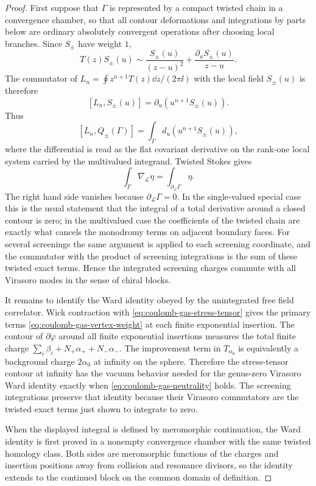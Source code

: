 \begin{proof}
First suppose that \(\Gamma\) is represented by a compact twisted chain in a
convergence chamber, so that all contour deformations and integrations by
parts below are ordinary absolutely convergent operations after choosing local
branches.  Since \(S_\pm\) have weight \(1\),
\[
  T(z)S_\pm(u)
  \sim
  \frac{S_\pm(u)}{(z-u)^2}
  +
  \frac{\partial_u S_\pm(u)}{z-u}.
\]
The commutator of \(L_n=\oint z^{n+1}T(z)\dd z/(2\pi\ii)\) with the local
field \(S_\pm(u)\) is therefore
\[
  [L_n,S_\pm(u)]
  =
  \partial_u\!\left(u^{n+1}S_\pm(u)\right).
\]
Thus
\[
  [L_n,Q_\pm(\Gamma)]
  =
  \int_\Gamma
  d_u\!\left(u^{n+1}S_\pm(u)\right),
\]
where the differential is read as the flat covariant derivative on the
rank-one local system carried by the multivalued integrand.  Twisted Stokes
gives
\[
  \int_\Gamma \nabla_{\mathcal L}\eta
  =
  \int_{\partial_{\mathcal L}\Gamma}\eta .
\]
The right hand side vanishes because \(\partial_{\mathcal L}\Gamma=0\).  In
the single-valued special case this is the usual statement that the integral
of a total derivative around a closed contour is zero; in the multivalued
case the coefficients of the twisted chain are exactly what cancels the
monodromy terms on adjacent boundary faces.  For several screenings the same
argument is applied to each screening coordinate, and the commutator with
the product of screening integrations is the sum of these twisted exact
terms.  Hence the integrated screening charges commute with all Virasoro
modes in the sense of chiral blocks.

It remains to identify the Ward identity obeyed by the unintegrated free
field correlator.  Wick contraction with
\eqref{eq:coulomb-gas-stress-tensor} gives the primary terms
\eqref{eq:coulomb-gas-vertex-weight} at each finite exponential insertion.
The contour of \(\partial\varphi\) around all finite exponential insertions
measures the total finite charge
\(\sum_i\beta_i+N_+\alpha_+ +N_-\alpha_-\).  The improvement term in
\(T_{\alpha_0}\) is equivalently a background charge \(2\alpha_0\) at
infinity on the sphere.  Therefore the stress-tensor contour at infinity has
the vacuum behavior needed for the genus-zero Virasoro Ward identity exactly
when \eqref{eq:coulomb-gas-neutrality} holds.  The screening integrations
preserve that identity because their Virasoro commutators are the twisted
exact terms just shown to integrate to zero.

When the displayed integral is defined by meromorphic continuation, the Ward
identity is first proved in a nonempty convergence chamber with the same
twisted homology class.  Both sides are meromorphic functions of the charges
and insertion positions away from collision and resonance divisors, so the
identity extends to the continued block on the common domain of definition.
\end{proof}

